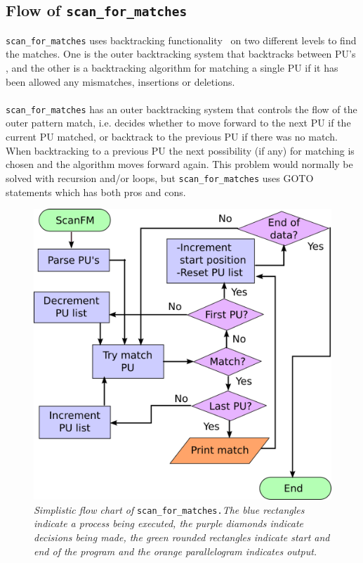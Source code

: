 \documentclass[12pt]{article}
\newcommand{\scm}{\texttt{scan\_for\_matches} }
\newcommand{\scmp}{\texttt{scan\_for\_matches.}}
\newcommand{\pu}{PU }
\newcommand{\pus}{PU's }
\begin{document}
\subsection{Flow of \scm}
\scm uses backtracking functionality~\cite{back} on two different levels to find the matches. 
One is the outer backtracking system that backtracks between \pus, and the other is a backtracking algorithm
for matching a single \pu if it has been allowed any mismatches, insertions or deletions. \\ \\
\scm has an outer backtracking system that controls the flow of the outer pattern match, i.e. decides whether to
move forward to the next \pu if the current \pu matched, or backtrack to the previous \pu if there was no match.
When backtracking to a previous \pu the next possibility (if any) for matching is chosen and the algorithm moves
forward again. This problem would normally be solved with recursion and/or loops, but \scm uses GOTO statements which has 
both pros and cons. \\
\begin{figure}[H]
\begin{center}
\includegraphics[scale=0.4]{Diagrams/ScanfmFlow.png}
\end{center}
\caption{\textit{Simplistic flow chart of} \scmp \textit{The blue rectangles indicate a process being executed, 
the purple diamonds indicate decisions being made, the green rounded rectangles indicate start and end of the program
and the orange parallelogram indicates output.}}
\end{figure}
\end{document}
